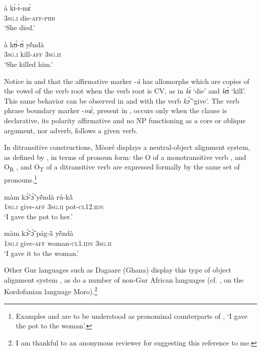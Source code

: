 \documentclass[output=paper]{langsci/langscibook}
\begin{document}
\ea
\label{ex:10.pacchiarotti}
\gll à    kɪ́-ɪ̀-mɛ̀      \\     
\textsc{3sg.i} die-\textsc{aff-phb} \\
\glt`She died.'
\z 

\ea
\label{ex:11.pacchiarotti}
\gll à    kʊ́-ʊ̀    yẽ́ndà\\
\textsc{3sg.i}    kill-\textsc{aff}  \textsc{3sg.ii}\\
\glt`She killed him.'
\z

Notice in  and  that the affirmative marker -\textit{à} has allomorphs which are copies of the vowel of the verb root when the verb root is CV, as in \textit{kɪ́} `die' and \textit{kʊ́} `kill'. This same behavior can be observed in  and  with the verb \textit{k\'{\~{ɔ}}} `give'. The verb phrase boundary marker -\textit{mɛ̀}, present in , occurs only when the clause is declarative, its polarity affirmative and no NP functioning as a core or oblique argument, nor adverb, follows a given verb.  

In ditransitive constructions, Mòoré displays a neutral-object alignment system, as defined by \citet{malchukovetal2010}, in terms of pronoun form: the O of a monotransitive verb , and O\textsubscript{R} , and O\textsubscript{T}  of a ditransitive verb are expressed formally by the same set of pronouns.\footnote{Examples  and  are to be understood as pronominal counterparts of , `I gave the pot to the woman'.} 

\ea
\label{ex:12.pacchiarotti}
\gll màm    kɔ̃́-ɔ̃̀      y\'{ẽ}ndà    rú-k\`{ã}\\
\textsc{1sg.i}    give-\textsc{aff}    \textsc{3sg.ii}    pot\textsc{-cl12.idn} \\
\glt `I gave the pot to her.'
\z

\ea
\label{ex:13.pacchiarotti}
\gll màm    kɔ̃́-ɔ̃̀    pág-\`{ã}      y\'{ẽ}ndà\\
\textsc{1sg.i}    give-\textsc{aff}  woman-\textsc{cl1.idn}  \textsc{3sg.ii} \\
\glt `I gave it to the woman.'
\z

Other Gur languages such as Dagaare (Ghana) display this type of object alignment system \citep{bodomo1997}, as do a number of non-Gur African languages (cf. \citealt{ackermanetaltoappear}, on the Kordofanian language Moro).\footnote{I am thankful to an anonymous reviewer for suggesting this reference to me.}
\end{document}
